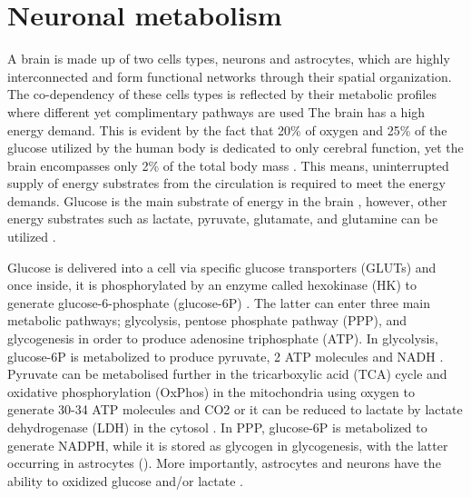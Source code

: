 \section{Neuronal metabolism}
A brain is made up of two cells types, neurons and astrocytes, which are highly interconnected and form functional networks through their spatial organization. The co-dependency of these cells types is reflected by their metabolic profiles where different yet complimentary pathways are used \citep{Belanger2011,Schonfeld2013} The brain has a high energy demand. This is evident by the fact that 20\% of oxygen and 25\% of the glucose utilized by the human body is dedicated to only cerebral function, yet the brain encompasses only 2\% of the total body mass \citep{Belanger2011}. This means, uninterrupted supply of energy substrates from the circulation is required to meet the energy demands. Glucose is the main substrate of energy in the brain 
\citep{Dienel2012,Pellerin2012} , however, other energy substrates such as lactate, pyruvate, glutamate, and glutamine can be utilized \citep{Zielke2009}.

Glucose is delivered into a cell via specific glucose transporters (GLUTs) and once inside, it is phosphorylated by an enzyme called hexokinase (HK) to generate glucose-6-phosphate (glucose-6P) \citep{Belanger2011,Herrero-Mendez2009}. The latter can enter three main metabolic pathways; glycolysis, pentose phosphate pathway (PPP), and glycogenesis in order to produce adenosine triphosphate (ATP). In glycolysis, glucose-6P is metabolized to produce pyruvate, 2 ATP molecules and NADH \citep{Belanger2011}. Pyruvate can be metabolised further in the tricarboxylic acid (TCA) cycle and oxidative phosphorylation (OxPhos) in the mitochondria using oxygen to generate 30-34 ATP molecules and CO2 or it can be reduced to lactate by lactate dehydrogenase (LDH) in the cytosol \citep{Belanger2011}. In PPP, glucose-6P is metabolized to generate NADPH, while it is stored as glycogen in glycogenesis, with the latter occurring in astrocytes \citep{Belanger2011} (). More importantly, astrocytes and neurons have the ability to oxidized glucose and/or lactate \citep{Zielke2009}.


